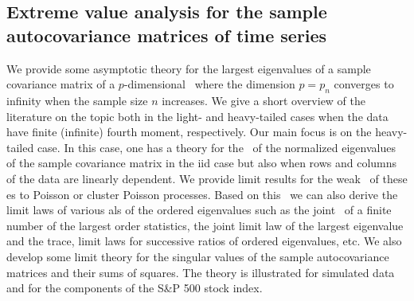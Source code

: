 \subsection{Extreme value analysis for the sample autocovariance
  matrices of time series}
We  provide some  asymptotic theory for the largest eigenvalues of a
sample covariance matrix of a $p$-dimensional \ts\ where the dimension
$p=p_n$ converges to infinity when the sample size $n$ increases. 
We give a short overview of the literature on the topic both in the
light- and heavy-tailed cases when the data have finite (infinite)
fourth moment, respectively. Our main focus is on the heavy-tailed
case. In this case, one has a theory for the \pp\ of the normalized
eigenvalues of the sample covariance matrix in the iid case but also
when rows and columns of the data are linearly dependent. We provide
limit results for the weak \con\ of these \pp es to Poisson or cluster
Poisson processes. Based on this \con\ we can also derive the limit
laws of various \fct als of the ordered eigenvalues such as the 
joint \con\ of a finite number of the largest order statistics, the
joint limit law of the largest eigenvalue and the trace, limit laws
for successive ratios of ordered eigenvalues, etc. We also develop
some limit theory for the singular values of the sample autocovariance
matrices and their sums of squares. The theory is illustrated for
simulated data and for the components of the S\&P 500 stock index. 
